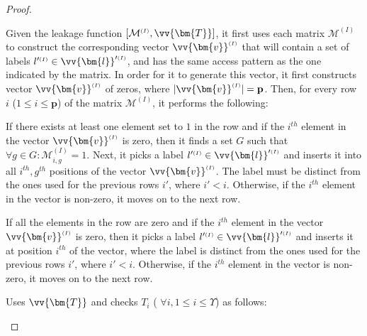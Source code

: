 \begin{proof}
\begin{packed_enum}
\item Given the leakage function $[\mathcal{M}^{\scriptscriptstyle (I)},\vv{\bm{T}}]$, it first uses each matrix $\mathcal{M}^{\scriptscriptstyle (I)}$ to construct the corresponding vector $\vv{\bm{v}}^{\scriptscriptstyle (I)}$ that will contain a set of labels $l'^{\scriptscriptstyle (I)}\in \vv{\bm{l}}'^{\scriptscriptstyle (I)}$, and has the same access pattern as the one indicated by the matrix. In order for it to generate this vector, it first constructs  vector $\vv{\bm{v}}^{\scriptscriptstyle (I)}$ of zeros, where $|\vv{\bm{v}}^{\scriptscriptstyle (I)}|=\textbf{p}$. Then, for every row $i$ ($1\leq i\leq \textbf{p}$) of the matrix $\mathcal{M}^{\scriptscriptstyle (I)}$, it performs the following:
\begin{packed_enum}
\item If there exists at least one element set to $1$ in the row and if the $i^{th}$ element in the vector $\vv{\bm{v}}^{\scriptscriptstyle (I)}$ is zero, then it finds a set $G$ such that $\forall g \in G: \mathcal{M}^{\scriptscriptstyle (I)}_{i,g}=1$. Next, it picks a label $l'^{\scriptscriptstyle (I)}\in \vv{\bm{l}}'^{\scriptscriptstyle (I)}$ and inserts it into all $i^{\scriptscriptstyle th}, g^{\scriptscriptstyle th}$ positions of the vector $\vv{\bm{v}}^{\scriptscriptstyle (I)}$. The label must be distinct from the ones used for the previous rows $i'$, where $i'<i$. Otherwise, if the $i^{th}$ element in the vector is non-zero,  it  moves on to the next row. 

\item If all the elements in the row are zero and if the $i^{\scriptscriptstyle th}$ element in the vector $\vv{\bm{v}}^{\scriptscriptstyle (I)}$ is zero, then it picks a label $l'^{\scriptscriptstyle (I)}\in \vv{\bm{l}}'^{\scriptscriptstyle (I)}$ and inserts it at position $i^{\scriptscriptstyle th}$ of the vector, where  the label is distinct from the ones used for the previous rows $i'$, where $i'<i$. Otherwise, if the $i^{\scriptscriptstyle th}$ element in the vector is non-zero,  it  moves on to the next row. 
\end{packed_enum}



\item  Uses $\vv{\bm{T}}$ and checks $T_{\scriptscriptstyle i}$ ( $\forall i, 1\leq i\leq \Upsilon$) as follows:


\end{packed_enum}
\end{proof}
